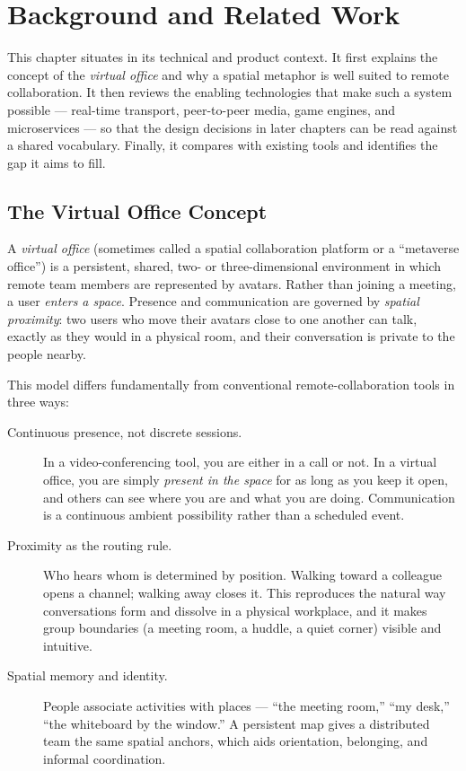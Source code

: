 \chapter{Background and Related Work}
\label{ch:background}

This chapter situates \voname{} in its technical and product context. It first
explains the concept of the \emph{virtual office} and why a spatial metaphor is
well suited to remote collaboration. It then reviews the enabling technologies
that make such a system possible --- real-time transport, peer-to-peer media,
game engines, and microservices --- so that the design decisions in later
chapters can be read against a shared vocabulary. Finally, it compares \voname{}
with existing tools and identifies the gap it aims to fill.

\section{The Virtual Office Concept}

A \emph{virtual office} (sometimes called a spatial collaboration platform or a
``metaverse office'') is a persistent, shared, two- or three-dimensional
environment in which remote team members are represented by avatars. Rather than
joining a meeting, a user \emph{enters a space}. Presence and communication are
governed by \emph{spatial proximity}: two users who move their avatars close to
one another can talk, exactly as they would in a physical room, and their
conversation is private to the people nearby.

This model differs fundamentally from conventional remote-collaboration tools in
three ways:

\begin{description}
  \item[Continuous presence, not discrete sessions.] In a video-conferencing
  tool, you are either in a call or not. In a virtual office, you are simply
  \emph{present in the space} for as long as you keep it open, and others can see
  where you are and what you are doing. Communication is a continuous ambient
  possibility rather than a scheduled event.

  \item[Proximity as the routing rule.] Who hears whom is determined by
  position. Walking toward a colleague opens a channel; walking away closes it.
  This reproduces the natural way conversations form and dissolve in a physical
  workplace, and it makes group boundaries (a meeting room, a huddle, a quiet
  corner) visible and intuitive.

  \item[Spatial memory and identity.] People associate activities with places ---
  ``the meeting room,'' ``my desk,'' ``the whiteboard by the window.'' A
  persistent map gives a distributed team the same spatial anchors, which aids
  orientation, belonging, and informal coordination.
\end{description}

